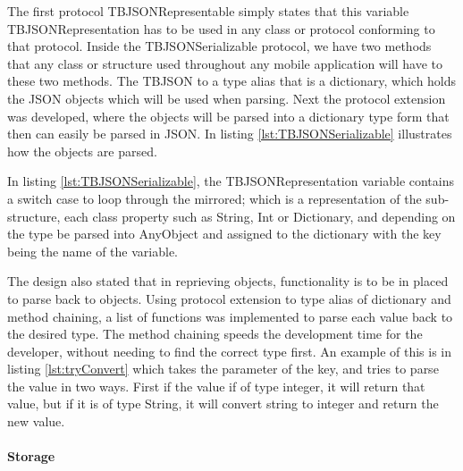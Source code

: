 

The first protocol TBJSONRepresentable simply states that this variable TBJSONRepresentation has to be used in any class or protocol conforming to that protocol. Inside the TBJSONSerializable protocol, we have two methods that any class or structure used throughout any mobile application will have to these two methods. The TBJSON to a type alias that is a dictionary, which holds the JSON objects which will be used when parsing. Next the protocol extension was developed, where the objects will be parsed into a dictionary type form that then can easily be parsed in JSON. In listing \ref{lst:TBJSONSerializable} illustrates how the objects are parsed.



In listing \ref{lst:TBJSONSerializable}, the TBJSONRepresentation variable contains a switch case to loop through the mirrored; which is a representation of the sub-structure, each class property such as String, Int or Dictionary, and depending on the type be parsed into AnyObject and assigned to the dictionary with the key being the name of the variable.

The design also stated that in reprieving objects, functionality is to be in placed to parse back to objects. Using protocol extension to type alias of dictionary and method chaining, a list of functions was implemented to parse each value back to the desired type. The method chaining speeds the development time for the developer, without needing to find the correct type first. An example of this is in listing \ref{lst:tryConvert} which takes the parameter of the key, and tries to parse the value in two ways. First if the value if of type integer, it will return that value, but if it is of type String, it will convert string to integer and return the new value.



\paragraph{Storage}

